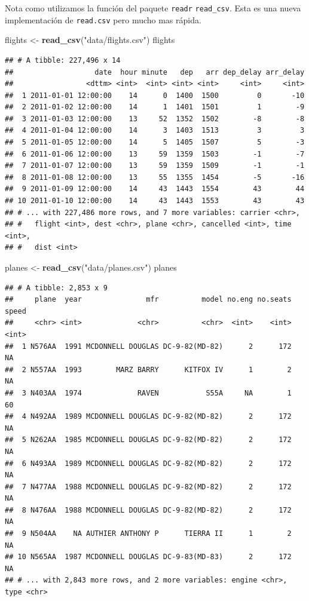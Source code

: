 \documentclass[]{article}
\newenvironment{Shaded}{\begin{snugshade}}{\end{snugshade}}
\newcommand{\KeywordTok}[1]{\textcolor[rgb]{0.13,0.29,0.53}{\textbf{#1}}}
\newcommand{\StringTok}[1]{\textcolor[rgb]{0.31,0.60,0.02}{#1}}
\newcommand{\NormalTok}[1]{#1}
\begin{document}
Nota como utilizamos la función del paquete \texttt{readr}
\texttt{read\_csv}. Esta es una nueva implementación de
\texttt{read.csv} pero mucho mas rápida.

\begin{Shaded}
\begin{Highlighting}[]
\NormalTok{flights <-}\StringTok{ }\KeywordTok{read_csv}\NormalTok{(}\StringTok{"data/flights.csv"}\NormalTok{)}
\NormalTok{flights}
\end{Highlighting}
\end{Shaded}

\begin{verbatim}
## # A tibble: 227,496 x 14
##                   date  hour minute   dep   arr dep_delay arr_delay
##                 <dttm> <int>  <int> <int> <int>     <int>     <int>
##  1 2011-01-01 12:00:00    14      0  1400  1500         0       -10
##  2 2011-01-02 12:00:00    14      1  1401  1501         1        -9
##  3 2011-01-03 12:00:00    13     52  1352  1502        -8        -8
##  4 2011-01-04 12:00:00    14      3  1403  1513         3         3
##  5 2011-01-05 12:00:00    14      5  1405  1507         5        -3
##  6 2011-01-06 12:00:00    13     59  1359  1503        -1        -7
##  7 2011-01-07 12:00:00    13     59  1359  1509        -1        -1
##  8 2011-01-08 12:00:00    13     55  1355  1454        -5       -16
##  9 2011-01-09 12:00:00    14     43  1443  1554        43        44
## 10 2011-01-10 12:00:00    14     43  1443  1553        43        43
## # ... with 227,486 more rows, and 7 more variables: carrier <chr>,
## #   flight <int>, dest <chr>, plane <chr>, cancelled <int>, time <int>,
## #   dist <int>
\end{verbatim}

\begin{Shaded}
\begin{Highlighting}[]
\NormalTok{planes <-}\StringTok{ }\KeywordTok{read_csv}\NormalTok{(}\StringTok{"data/planes.csv"}\NormalTok{)}
\NormalTok{planes}
\end{Highlighting}
\end{Shaded}

\begin{verbatim}
## # A tibble: 2,853 x 9
##     plane  year               mfr          model no.eng no.seats speed
##     <chr> <int>             <chr>          <chr>  <int>    <int> <int>
##  1 N576AA  1991 MCDONNELL DOUGLAS DC-9-82(MD-82)      2      172    NA
##  2 N557AA  1993        MARZ BARRY      KITFOX IV      1        2    NA
##  3 N403AA  1974             RAVEN           S55A     NA        1    60
##  4 N492AA  1989 MCDONNELL DOUGLAS DC-9-82(MD-82)      2      172    NA
##  5 N262AA  1985 MCDONNELL DOUGLAS DC-9-82(MD-82)      2      172    NA
##  6 N493AA  1989 MCDONNELL DOUGLAS DC-9-82(MD-82)      2      172    NA
##  7 N477AA  1988 MCDONNELL DOUGLAS DC-9-82(MD-82)      2      172    NA
##  8 N476AA  1988 MCDONNELL DOUGLAS DC-9-82(MD-82)      2      172    NA
##  9 N504AA    NA AUTHIER ANTHONY P      TIERRA II      1        2    NA
## 10 N565AA  1987 MCDONNELL DOUGLAS DC-9-83(MD-83)      2      172    NA
## # ... with 2,843 more rows, and 2 more variables: engine <chr>, type <chr>
\end{verbatim}
\end{document}
